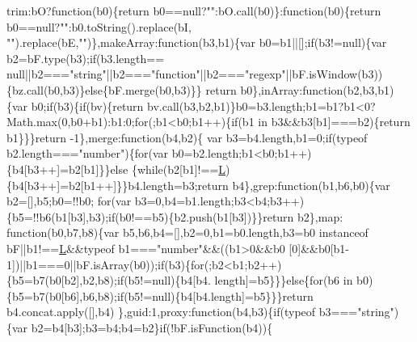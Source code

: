 \begin{DoxyCode}
      trim:bO?\textcolor{keyword}{function}(b0)\{\textcolor{keywordflow}{return} b0==null?\textcolor{stringliteral}{""}:bO.call(b0)\}:\textcolor{keyword}{function}(b0)\{\textcolor{keywordflow}{return} b0==null?\textcolor{stringliteral}{""}:b0.toString().replace(bI,\textcolor{stringliteral}{
      ""}).replace(bE,\textcolor{stringliteral}{""})\},makeArray:\textcolor{keyword}{function}(b3,b1)\{var b0=b1||[];\textcolor{keywordflow}{if}(b3!=null)\{var b2=bF.type(b3);\textcolor{keywordflow}{if}(b3.length==
      null||b2===\textcolor{stringliteral}{"string"}||b2===\textcolor{stringliteral}{"function"}||b2===\textcolor{stringliteral}{"regexp"}||bF.isWindow(b3))\{bz.call(b0,b3)\}\textcolor{keywordflow}{else}\{bF.merge(b0,b3)\}\}\textcolor{keywordflow}{
      return} b0\},inArray:\textcolor{keyword}{function}(b2,b3,b1)\{var b0;\textcolor{keywordflow}{if}(b3)\{\textcolor{keywordflow}{if}(bv)\{\textcolor{keywordflow}{return} bv.call(b3,b2,b1)\}b0=b3.length;b1=b1?b1<0?
      Math.max(0,b0+b1):b1:0;\textcolor{keywordflow}{for}(;b1<b0;b1++)\{\textcolor{keywordflow}{if}(b1 in b3&&b3[b1]===b2)\{\textcolor{keywordflow}{return} b1\}\}\}\textcolor{keywordflow}{return} -1\},merge:\textcolor{keyword}{function}(b4,b2)\{
      var b3=b4.length,b1=0;\textcolor{keywordflow}{if}(typeof b2.length===\textcolor{stringliteral}{"number"})\{\textcolor{keywordflow}{for}(var b0=b2.length;b1<b0;b1++)\{b4[b3++]=b2[b1]\}\}\textcolor{keywordflow}{else}
      \{\textcolor{keywordflow}{while}(b2[b1]!==\hyperlink{jquery_8js_a38ee4c0b5f4fe2a18d0c783af540d253}{L})\{b4[b3++]=b2[b1++]\}\}b4.length=b3;\textcolor{keywordflow}{return} b4\},grep:\textcolor{keyword}{function}(b1,b6,b0)\{var b2=[],b5;b0=!!b0;\textcolor{keywordflow}{
      for}(var b3=0,b4=b1.length;b3<b4;b3++)\{b5=!!b6(b1[b3],b3);\textcolor{keywordflow}{if}(b0!==b5)\{b2.push(b1[b3])\}\}\textcolor{keywordflow}{return} b2\},map:\textcolor{keyword}{
      function}(b0,b7,b8)\{var b5,b6,b4=[],b2=0,b1=b0.length,b3=b0 instanceof bF||b1!==\hyperlink{jquery_8js_a38ee4c0b5f4fe2a18d0c783af540d253}{L}&&typeof b1===\textcolor{stringliteral}{"number"}&&((b1>0&&b0
      [0]&&b0[b1-1])||b1===0||bF.isArray(b0));\textcolor{keywordflow}{if}(b3)\{\textcolor{keywordflow}{for}(;b2<b1;b2++)\{b5=b7(b0[b2],b2,b8);\textcolor{keywordflow}{if}(b5!=null)\{b4[b4.
      length]=b5\}\}\}\textcolor{keywordflow}{else}\{\textcolor{keywordflow}{for}(b6 in b0)\{b5=b7(b0[b6],b6,b8);\textcolor{keywordflow}{if}(b5!=null)\{b4[b4.length]=b5\}\}\}\textcolor{keywordflow}{return} b4.concat.apply([],b4)
      \},guid:1,proxy:\textcolor{keyword}{function}(b4,b3)\{\textcolor{keywordflow}{if}(typeof b3===\textcolor{stringliteral}{"string"})\{var b2=b4[b3];b3=b4;b4=b2\}\textcolor{keywordflow}{if}(!bF.isFunction(b4))\{\textcolor{keywordflow}{
}
\end{DoxyCode}
